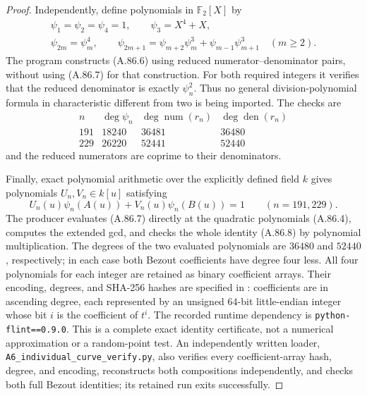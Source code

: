 \documentclass[11pt]{article}
\begin{document}
\begin{proof}
Independently, define polynomials in \(\mathbb F_2[X]\) by
\[
 \begin{gathered}
 \psi_1=\psi_2=\psi_4=1,\qquad \psi_3=X^4+X,\\
 \psi_{2m}=\psi_m^4,\qquad
 \psi_{2m+1}=\psi_{m+2}\psi_m^3+
                       \psi_{m-1}\psi_{m+1}^3\quad(m\ge2).
 \end{gathered}                                                 \tag{A.86.7}
\]
The program 
constructs (A.86.6) using reduced numerator--denominator pairs,
without using (A.86.7) for that construction. For both required
integers it verifies that the reduced denominator is exactly
\(\psi_n^2\). Thus no general division-polynomial formula in
characteristic different from two is being imported. The checks are
\[
\begin{array}{c|r|r|r}
 n&\deg\psi_n&\deg\operatorname{num}(r_n)&
                         \deg\operatorname{den}(r_n)\\\hline
 191&18240&36481&36480\\
 229&26220&52441&52440
\end{array}
\]
and the reduced numerators are coprime to their denominators.

Finally, exact polynomial arithmetic over the explicitly defined
field \(k\) gives polynomials \(U_n,V_n\in k[u]\) satisfying
\[
       U_n(u)\psi_n(A(u))+V_n(u)\psi_n(B(u))=1
                \qquad(n=191,229).                            \tag{A.86.8}
\]
The producer  evaluates
(A.86.7) directly at the quadratic polynomials (A.86.4), computes
the extended gcd, and checks the whole identity (A.86.8) by
polynomial multiplication. The degrees of the two evaluated
polynomials are \(36480\) and \(52440\), respectively; in
each case both Bezout coefficients have degree four less.
All four polynomials for each integer are retained as binary
coefficient arrays. Their encoding, degrees, and SHA-256 hashes
are specified in :
coefficients are in ascending degree, each represented by an
unsigned 64-bit little-endian integer whose bit \(i\) is the
coefficient of \(t^i\). The recorded runtime dependency is
\texttt{python-flint==0.9.0}. This is a complete exact identity
certificate, not a numerical approximation or a random-point test.
An independently written loader, \texttt{A6\_individual\_curve\_verify.py},
also verifies every coefficient-array hash, degree, and encoding,
reconstructs both compositions independently, and checks both full
Bezout identities; its retained run exits successfully.


\end{proof}
\end{document}
